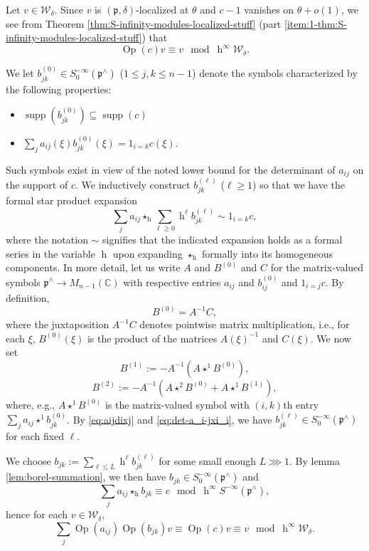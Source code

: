 \documentclass[reqno]{amsart}
\DeclareMathOperator{\h}{h}
\DeclareMathOperator{\Opp}{Op}
\DeclareMathOperator{\supp}{supp}
\theoremstyle{plain} \newtheorem{theorem} {Theorem}
\theoremstyle{definition} \newtheorem{definition} [theorem] {Definition}
\theoremstyle{itplain} %
\numberwithin{equation}{section}
\numberwithin{theorem}{section}
\renewcommand{\geq}{\geqslant}
\renewcommand{\leq}{\leqslant}
\begin{document}
Let $v \in \mathcal{W}_\delta$.  Since $v$ is $(\mathfrak{p},\delta)$-localized at $\theta$ and $c-1$ vanishes on $\theta + o(1)$, we see from Theorem \ref{thm:S-infinity-modules-localized-stuff} (part \eqref{item:1-thm:S-infinity-modules-localized-stuff}) that
\begin{equation*}%
  \Opp(c) v \equiv v \mod{\h^\infty
    \mathcal{W}_\delta}.
\end{equation*}

We let $b_{j k}^{(0)} \in S^{-\infty}_0(\mathfrak{p}^\wedge)$ ($1 \leq j,k \leq n-1$) denote the symbols characterized by the following properties:
\begin{itemize}
\item $\supp(b_{j k}^{(0)}) \subseteq \supp(c)$
\item $\sum_j a_{i j}(\xi) b_{j k}^{(0)}(\xi) = 1_{i=k} c(\xi)$.
\end{itemize}
Such symbols exist in view of the noted lower bound for the determinant of $a_{i j}$ on the support of $c$.  We inductively construct $b_{jk}^{(\ell)}$ ($\ell \geq 1$) so that we have the formal star product expansion
\begin{equation}\label{eqn:formal-star-prod-matrix}
  \sum_j a_{i j} \star_{\h} \sum_{\ell \geq 0} \h^{\ell} b_{j k}^{(\ell)} \sim  1_{i=k} c,
\end{equation}
where the notation $\sim$ signifies that the indicated expansion holds as a formal series in the variable $\h$ upon expanding $\star_{\h}$ formally into its homogeneous components.  In more detail, let us write $A$ and $B^{(0)}$ and $C$ for the matrix-valued symbols $\mathfrak{p}^\wedge \rightarrow M_{n-1}(\mathbb{C})$ with respective entries $a_{i j}$ and $b_{i j}^{(0)}$ and $1_{i =j} c$.  By definition,
\[
  B^{(0)} = A^{-1} C,
\]
where the juxtaposition $A^{-1} C$ denotes pointwise matrix multiplication, i.e., for each $\xi$, $B^{(0)}(\xi)$ is the product of the matrices $A(\xi)^{-1}$ and $C(\xi)$.  We now set
\[
  B^{(1)} := - A^{-1} (A \star^1 B^{(0)}),
\]
\[
  B^{(2)} := -A^{-1} ( A \star^2 B^{(0)} + A \star^1 B^{(1)}),
\]
where, e.g., $A \star^1 B^{(0)}$ is the matrix-valued symbol with $(i,k)$th entry $\sum_j a_{i j} \star^1 b_{j k}^{(0)}$.  By \eqref{eq:aijdixj} and \eqref{eq:det-a_i-jxi_i}, we have $b_{j k}^{(\ell)} \in S^{-\infty}_0(\mathfrak{p}^\wedge)$ for each fixed $\ell$. %

We choose $b_{jk} := \sum_{\ell \leq L} \h^{\ell} b_{j k}^{(\ell)}$ for some small enough $L \ggg 1$.  By lemma \ref{lem:borel-summation}, we then have $b_{j k} \in S^{-\infty}_0(\mathfrak{p}^\wedge)$ and
\begin{equation*}
  \sum_j a_{i j} \star_{\h} b_{j k}
  \equiv c \mod{\h^\infty S^{-\infty}(\mathfrak{p}^\wedge)},
\end{equation*}
hence for each $v \in \mathcal{W}_\delta$,
\begin{equation}\label{eqn:approx-invert-operators-aij-bjk}
  \sum_j \Opp(a_{i j})
  \Opp(b_{j k})
  v
  \equiv 
  \Opp(c) v
  \equiv v
  \mod{\h^\infty \mathcal{W}_\delta}.
\end{equation}
\end{document}
